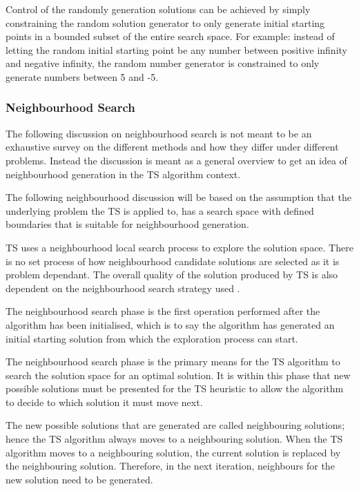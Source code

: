 Control of the randomly generation solutions can be achieved by simply constraining the random solution generator to only generate initial starting points in a bounded subset of the entire search space. For example: instead of letting the random initial starting point be any number between positive infinity and negative infinity, the random number generator is constrained to only generate numbers between 5 and -5.

\subsubsection{Neighbourhood Search}
The following discussion on neighbourhood search is not meant to be an exhaustive survey on the different methods and how they differ under different problems. Instead the discussion is meant as a general overview to get an idea of neighbourhood generation in the \gls{TS} algorithm context. 

The following neighbourhood discussion will be based on the assumption that the underlying problem the \gls{TS} is applied to, has a search space with defined boundaries that is suitable for neighbourhood generation.

TS uses a neighbourhood local search process to explore the solution space. There is no set process of how neighbourhood candidate solutions are selected as it is problem dependant. The overall quality of the solution produced by \gls{TS} is also dependent on the neighbourhood search strategy used \cite{TSHazardous}. 

The neighbourhood search phase is the first operation performed after the algorithm has been initialised, which is to say the algorithm has generated an initial starting solution from which the exploration process can start.

The neighbourhood search phase is the primary means for the \gls{TS} algorithm to search the solution space for an optimal solution. It is within this phase that new possible solutions must be presented for the \gls{TS} heuristic to allow the algorithm to decide to which solution it must move next.

The new possible solutions that are generated are called neighbouring solutions; hence the \gls{TS} algorithm always moves to a neighbouring solution. When the \gls{TS} algorithm moves to a neighbouring solution, the current solution is replaced by the neighbouring solution. Therefore, in the next iteration, neighbours for the new solution need to be generated.

